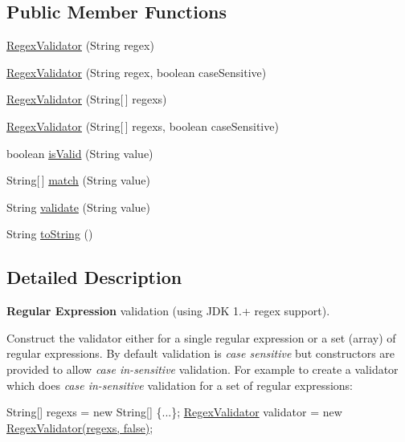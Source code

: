 \subsection*{Public Member Functions}
\begin{DoxyCompactItemize}
\item 
\hyperlink{classRegexValidator_a6aebddf94f8fcd8e3e59c5f815fe91d9}{Regex\+Validator} (String regex)
\item 
\hyperlink{classRegexValidator_a58c7266d66ccd96f86427b2f3b05ca36}{Regex\+Validator} (String regex, boolean case\+Sensitive)
\item 
\hyperlink{classRegexValidator_a71a78f0ac0a7d799dcb3b769659fe1f6}{Regex\+Validator} (String\mbox{[}$\,$\mbox{]} regexs)
\item 
\hyperlink{classRegexValidator_acc8868d903890615c99044b841a79265}{Regex\+Validator} (String\mbox{[}$\,$\mbox{]} regexs, boolean case\+Sensitive)
\item 
boolean \hyperlink{classRegexValidator_adf161a2df40e7d80be0088a20af715d2}{is\+Valid} (String value)
\item 
String\mbox{[}$\,$\mbox{]} \hyperlink{classRegexValidator_aa4c1660ff32c1aecc8f616a2cfef80ed}{match} (String value)
\item 
String \hyperlink{classRegexValidator_a4ded906679cf17678ba42604b90c9e86}{validate} (String value)
\item 
String \hyperlink{classRegexValidator_a504dcfb95f1458ff9fa479404a50090e}{to\+String} ()
\end{DoxyCompactItemize}


\subsection{Detailed Description}
{\bfseries Regular Expression} validation (using J\+DK 1.+ regex support). 

Construct the validator either for a single regular expression or a set (array) of regular expressions. By default validation is {\itshape case sensitive} but constructors are provided to allow {\itshape case in-\/sensitive} validation. For example to create a validator which does {\itshape case in-\/sensitive} validation for a set of regular expressions\+: 
\begin{DoxyPre}
        String[] regexs = new String[] \{...\};
        \hyperlink{classRegexValidator}{RegexValidator} validator = new \hyperlink{classRegexValidator}{RegexValidator(regexs, false)};
\end{DoxyPre}
 


